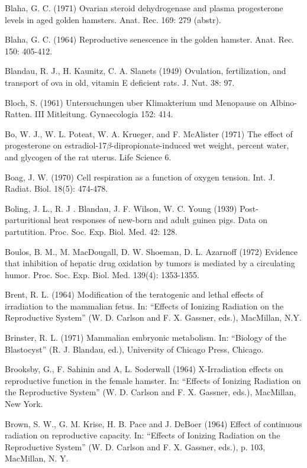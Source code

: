 Blaha, G. C. (1971) Ovarian steroid dehydrogenase and plasma progesterone levels in aged golden hamsters. Anat. Rec. 169: 279 (abstr).

Blaha, G. C. (1964) Reproductive senescence in the golden hamster. Anat. Rec. 150: 405-412.

Blandau, R. J., H. Kaunitz, C. A. Slanets (1949) Ovulation, fertilization, and transport of ova in old, vitamin E deficient rats. J. Nut. 38: 97.

Bloch, S. (1961) Untersuchungen uber Klimakterium und Menopause on Albino-Ratten. III Mitleitung. Gynaecologia 152: 414.

Bo, W. J., W. L. Poteat, W. A. Krueger, and F. McAlister (1971)
The effect of progesterone on estradiol-17$\beta$-dipropionate-induced wet weight, percent water, and glycogen of the rat uterus. Life Science 6.

Boag, J. W. (1970) Cell respiration as a function of oxygen tension. Int. J. Radiat. Biol. 18(5): 474-478.

Boling, J. L., R. J . Blandau, J. F. Wilson, W. C. Young (1939) Post-parturitional heat responses of new-born and adult guinea pigs. Data on partutition. Proc. Soc. Exp. Biol. Med. 42: 128.

Boulos, B. M., M. MacDougall, D. W. Shoeman, D. L. Azarnoff (1972) Evidence that inhibition of hepatic drug oxidation by tumors is mediated by a circulating humor. Proc. Soc. Exp. Biol. Med. 139(4): 1353-1355.

Brent, R. L. (1964) Modification of the teratogenic and lethal effects of irradiation to the mammalian fetus. In: ``Effects of Ionizing Radiation on the Reproductive System'' (W. D. Carlson and F. X. Gassner, eds.), MacMillan, N.Y.


Brinster, R. L. (1971) Mammalian embryonic metabolism. In: ``Biology of the Blastocyst'' (R. J. Blandau, ed.), University of Chicago Press, Chicago.

Brooksby, G., F. Sahinin and A, L. Soderwall (1964) X-Irradiation effects on reproductive function in the female hamster. In: ``Effects of Ionizing Radiation on the Reproductive System'' (W. D. Carlson and F. X. Gassner, eds.), MacMillan, New York.

Brown, S. W., G. M. Krise, H. B. Pace and J. DeBoer (1964) Effect of continuous radiation on reproductive capacity. In: ``Effects of Ionizing Radiation on the Reproductive System'' (W. D. Carlson and F. X. Gassner, eds.), p. 103, MacMillan, N. Y.

